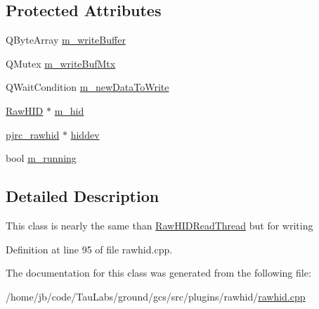 \subsection*{\-Protected \-Attributes}
\begin{DoxyCompactItemize}
\item 
\-Q\-Byte\-Array \hyperlink{group___raw_h_i_d_plugin_ga4b0316d5c6599d45686fc5066a246e7e}{m\-\_\-write\-Buffer}
\item 
\-Q\-Mutex \hyperlink{group___raw_h_i_d_plugin_gaa53a045dd368b7ad82ac5853679019e0}{m\-\_\-write\-Buf\-Mtx}
\item 
\-Q\-Wait\-Condition \hyperlink{group___raw_h_i_d_plugin_ga1554ff98394a7da1f15042ff26061348}{m\-\_\-new\-Data\-To\-Write}
\item 
\hyperlink{class_raw_h_i_d}{\-Raw\-H\-I\-D} $\ast$ \hyperlink{group___raw_h_i_d_plugin_ga753f0d79e5633e60df867fe7c35dd6e4}{m\-\_\-hid}
\item 
\hyperlink{classpjrc__rawhid}{pjrc\-\_\-rawhid} $\ast$ \hyperlink{group___raw_h_i_d_plugin_ga7ce382fd2ebb17e10007aed01dea1d6f}{hiddev}
\item 
bool \hyperlink{group___raw_h_i_d_plugin_gaf4f4725b8f0b6ed4b9b5c751397d0abe}{m\-\_\-running}
\end{DoxyCompactItemize}


\subsection{\-Detailed \-Description}
\-This class is nearly the same than \hyperlink{class_raw_h_i_d_read_thread}{\-Raw\-H\-I\-D\-Read\-Thread} but for writing 

\-Definition at line 95 of file rawhid.\-cpp.



\-The documentation for this class was generated from the following file\-:\begin{DoxyCompactItemize}
\item 
/home/jb/code/\-Tau\-Labs/ground/gcs/src/plugins/rawhid/\hyperlink{rawhid_8cpp}{rawhid.\-cpp}\end{DoxyCompactItemize}
